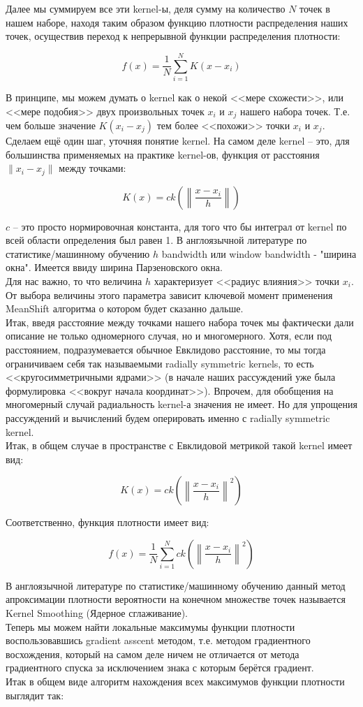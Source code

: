 \documentclass[11pt]{article}
\begin{document}
    Далее мы суммируем все эти kernel-ы, деля сумму на количество $N$ точек
в нашем наборе, находя таким образом функцию плотности распределения
наших точек, осуществив переход к непрерывной функции распределения
плотности:

$$
f(x) = \frac{1}{N}\sum\limits_{i = 1}^{N}K(x - x_i) 
$$

В принципе, мы можем думать о kernel как о некой
<<мере схожести>>, или <<мере подобия>> двух произвольных
точек $x_i$ и $x_j$ нашего набора точек. Т.е. чем больше значение
$K(x_i - x_j)$ тем более <<похожи>> точки $x_i$ и $x_j$.
\\ Сделаем ещё один шаг, уточняя понятие kernel. На самом
деле kernel -- это, для большинства применяемых на практике kernel-ов,
функция от расстояния $\|x_i - x_j\|$ между точками:

$$
K(x) = ck\left(\left\|\frac{x - x_i}{h}\right\|\right)
$$

$c$ -- это
просто нормировочная константа, для того что бы интеграл от kernel по
всей области определения был равен 1. В англоязычной литературе по
статистике/машинному обучению $h$ bandwidth или window bandwidth -
"ширина окна". Имеется ввиду ширина Парзеновского окна.
\\ Для нас важно, то что величина $h$ характеризует
<<радиус влияния>> точки $x_i$. От выбора величины этого параметра
зависит ключевой момент применения MeanShift алгоритма о котором будет
сказанно дальше. \\ Итак, введя расстояние между точками
нашего набора точек мы фактически дали описание не только одномерного
случая, но и многомерного. Хотя, если под расстоянием, подразумевается
обычное Евклидово расстояние, то мы тогда ограничиваем себя так
называемыми radially symmetric kernels, то есть
<<кругосимметричными ядрами>> (в начале наших рассуждений уже была
формулировка <<вокруг начала координат>>). Впрочем, для обобщения
на многомерный случай радиальность kernel-а значения не имеет. Но для
упрощения рассуждений и вычислений будем оперировать именно с radially
symmetric kernel. \\ Итак, в общем случае в пространстве с
Евклидовой метрикой такой kernel имеет вид:

$$
K(x) = ck\left(\left\|\frac{x - x_i}{h}\right\|^2\right)
$$

Соответственно, функция плотности имеет вид:

$$
f(x) = \frac{1}{N}\sum\limits_{i = 1}^{N}ck\left(\left\|\frac{x - x_i}{h}\right\|^2\right)
$$

В англоязычной литературе по статистике/машинному обучению данный
метод апроксимации плотности вероятности на конечном множестве точек
называется Kernel Smoothing (Ядерное сглаживание).
\\ Теперь мы можем найти локальные максимумы функции
плотности воспользовавшись gradient asscent методом, т.е. методом
градиентного восхождения, который на самом деле ничем не отличается от
метода градиентного спуска за исключением знака с которым берётся
градиент. \\ Итак в общем виде алгоритм нахождения всех
максимумов функции плотности выглядит так:
\end{document}
